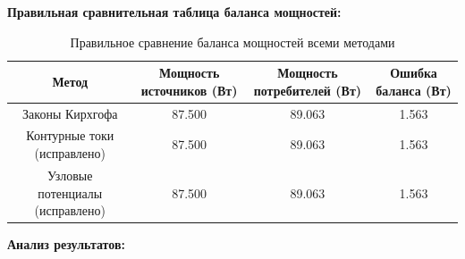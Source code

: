 \textbf{Правильная сравнительная таблица баланса мощностей:}
\begin{table}[H]
\centering
\begin{tabular}{|c|c|c|c|}
\hline
\textbf{Метод} & \textbf{Мощность источников (Вт)} & \textbf{Мощность потребителей (Вт)} & \textbf{Ошибка баланса (Вт)} \\
\hline
Законы Кирхгофа & 87.500 & 89.063 & 1.563 \\
\hline
Контурные токи (исправлено) & 87.500 & 89.063 & 1.563 \\
\hline
Узловые потенциалы (исправлено) & 87.500 & 89.063 & 1.563 \\
\hline
\end{tabular}
\caption{Правильное сравнение баланса мощностей всеми методами}
\label{tab:correct_power_balance_comparison}
\end{table}

\textbf{Анализ результатов:}

